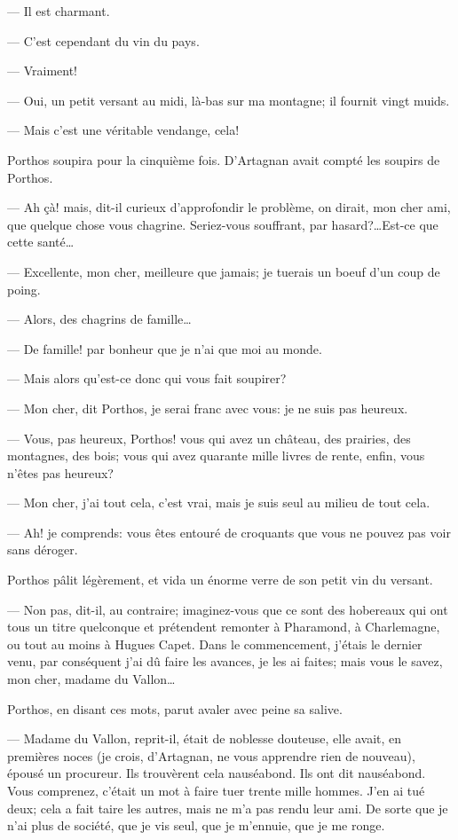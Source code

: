 — Il est charmant.

— C'est cependant du vin du pays.

— Vraiment!

— Oui, un petit versant au midi, là-bas sur ma montagne; il fournit vingt muids.

— Mais c'est une véritable vendange, cela!

Porthos soupira pour la cinquième fois. D'Artagnan avait compté les soupirs de Porthos.

— Ah çà! mais, dit-il curieux d'approfondir le problème, on dirait, mon cher ami, que quelque chose vous chagrine. Seriez-vous souffrant, par hasard?\dots Est-ce que cette santé\dots

— Excellente, mon cher, meilleure que jamais; je tuerais un boeuf d'un coup de poing.

— Alors, des chagrins de famille\dots

— De famille! par bonheur que je n'ai que moi au monde.

— Mais alors qu'est-ce donc qui vous fait soupirer?

— Mon cher, dit Porthos, je serai franc avec vous: je ne suis pas heureux.

— Vous, pas heureux, Porthos! vous qui avez un château, des prairies, des montagnes, des bois; vous qui avez quarante mille livres de rente, enfin, vous n'êtes pas heureux?

— Mon cher, j'ai tout cela, c'est vrai, mais je suis seul au milieu de tout cela.

— Ah! je comprends: vous êtes entouré de croquants que vous ne pouvez pas voir sans déroger.

Porthos pâlit légèrement, et vida un énorme verre de son petit vin du versant.

— Non pas, dit-il, au contraire; imaginez-vous que ce sont des hobereaux qui ont tous un titre quelconque et prétendent remonter à Pharamond, à Charlemagne, ou tout au moins à Hugues Capet. Dans le commencement, j'étais le dernier venu, par conséquent j'ai dû faire les avances, je les ai faites; mais vous le savez, mon cher, madame du Vallon\dots

Porthos, en disant ces mots, parut avaler avec peine sa salive.

— Madame du Vallon, reprit-il, était de noblesse douteuse, elle avait, en premières noces (je crois, d'Artagnan, ne vous apprendre rien de nouveau), épousé un procureur. Ils trouvèrent cela nauséabond. Ils ont dit nauséabond. Vous comprenez, c'était un mot à faire tuer trente mille hommes. J'en ai tué deux; cela a fait taire les autres, mais ne m'a pas rendu leur ami. De sorte que je n'ai plus de société, que je vis seul, que je m'ennuie, que je me ronge.

